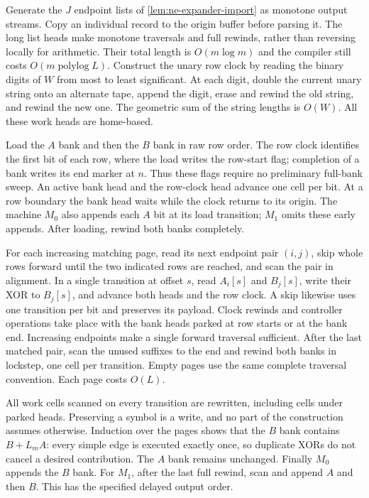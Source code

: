 \begin{informalproof}
Generate the $J$ endpoint lists of \cref{lem:ne-expander-import} as
monotone output streams.  Copy an individual record to the origin buffer
before parsing it.  The long list heads make monotone traversals and full
rewinds, rather than reversing locally for arithmetic.  Their total length
is $O(m\log m)$ and the compiler still costs
$O(m\operatorname{polylog}L)$.  Construct the unary row clock by reading
the binary digits of $W$ from most to least significant.  At each digit,
double the current unary string onto an alternate tape, append the digit,
erase and rewind the old string, and rewind the new one.  The geometric
sum of the string lengths is $O(W)$.  All these work heads are home-based.

Load the $A$ bank and then the $B$ bank in raw row order.  The row clock
identifies the first bit of each row, where the load writes the row-start
flag; completion of a bank writes its end marker at $n$.  Thus these
flags require no preliminary full-bank sweep.  An active bank head and
the row-clock head advance one cell per bit.  At a row boundary
the bank head waits while the clock returns to its origin.  The machine
$M_0$ also appends each $A$ bit at its load transition; $M_1$ omits these
early appends.  After loading, rewind both banks completely.

For each increasing matching page, read its next endpoint pair $(i,j)$,
skip whole rows forward until the two indicated rows are reached, and
scan the pair in alignment.  In a single transition at offset $s$, read
$A_i[s]$ and $B_j[s]$, write their XOR to $B_j[s]$, and advance both heads
and the row clock.  A skip likewise uses one transition per bit and
preserves its payload.  Clock rewinds and controller operations take place
with the bank heads parked at row starts or at the bank end.  Increasing
endpoints make a single forward traversal sufficient.  After the last
matched pair, scan the unused suffixes to the end and rewind both banks
in lockstep, one cell per transition.  Empty pages use the same complete
traversal convention.  Each page costs $O(L)$.

All work cells scanned on every transition are rewritten, including cells
under parked heads.  Preserving a symbol is a write, and no part of the
construction assumes otherwise.  Induction over the pages shows that the
$B$ bank contains $B+L_mA$: every simple edge is executed exactly once,
so duplicate XORs do not cancel a desired contribution.  The $A$ bank
remains unchanged.  Finally $M_0$ appends the $B$ bank.  For $M_1$, after
the last full rewind, scan and append $A$ and then $B$.  This has the
specified delayed output order.


\end{informalproof}
